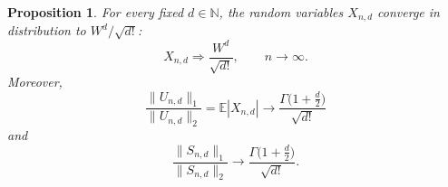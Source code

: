 \documentclass[11pt,showkeys]{amsart}
\newtheorem{proposition}[theorem]{Proposition}
\begin{document}
\begin{proposition}
\label{thm:torus-multilinear-limit}
For every fixed \(d\in\mathbb N\), the random variables \(X_{n,d}\)
converge in distribution to \(W^d/\sqrt{d!}\):
\[
    X_{n,d}
    \Longrightarrow
    \frac{W^d}{\sqrt{d!}},
    \qquad n\to\infty.
\]
Moreover,
\begin{equation}
\label{eq:torus-full-l1-l2-limit-first}
    \frac{\|U_{n,d}\|_1}{\|U_{n,d}\|_2}
    =
    \mathbb E|X_{n,d}|
    \longrightarrow
    \frac{\Gamma\bigl(1+\frac d2\bigr)}{\sqrt{d!}}
\end{equation}
and
\begin{equation}
\label{eq:torus-full-l1-l2-limit}
    \frac{\|S_{n,d}\|_1}{\|S_{n,d}\|_2}
    \longrightarrow
    \frac{\Gamma\bigl(1+\frac d2\bigr)}{\sqrt{d!}}.
\end{equation}
\end{proposition}
\end{document}
